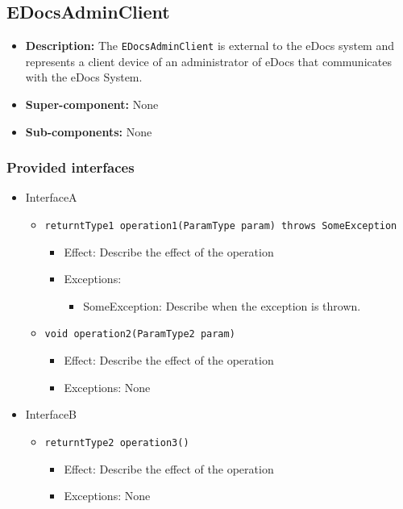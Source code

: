 \documentclass[a4paper,10pt]{article}
\begin{document}
\subsection{EDocsAdminClient}
\begin{itemize}
    \item \textbf{Description:} The \texttt{EDocsAdminClient} is external to the eDocs system and represents a client device of an administrator of eDocs that communicates with the eDocs System.
    \item \textbf{Super-component:} None
    \item \textbf{Sub-components:} None
\end{itemize}

\subsubsection*{Provided interfaces}
\begin{itemize}
    \item InterfaceA
    \begin{itemize}
        \item \texttt{returntType1 operation1(ParamType param) throws SomeException}
        \begin{itemize}
            \item Effect: Describe the effect of the operation
            \item Exceptions:
            \begin{itemize}
                \item SomeException: Describe when the exception is thrown.
            \end{itemize}
		\end{itemize}
        \item \texttt{void operation2(ParamType2 param)}
        \begin{itemize}
            \item Effect: Describe the effect of the operation
            \item Exceptions: None
        \end{itemize}
    \end{itemize}

    \item InterfaceB
    \begin{itemize}
        \item \texttt{returntType2 operation3()}
        \begin{itemize}
            \item Effect: Describe the effect of the operation
            \item Exceptions: None
        \end{itemize}
    \end{itemize}
\end{itemize}
\end{document}

